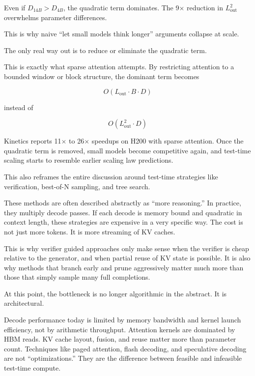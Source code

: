 \documentclass[12pt]{article}
\begin{document}
Even if $D_{14B} > D_{4B}$, the quadratic term dominates. The 9$\times$ reduction in $L_\text{out}^2$ overwhelms parameter differences.

This is why naive ``let small models think longer'' arguments collapse at scale.

The only real way out is to reduce or eliminate the quadratic term.

This is exactly what sparse attention attempts. By restricting attention to a bounded window or block structure, the dominant term becomes

\begin{equation}
O(L_\text{out} \cdot B \cdot D)
\end{equation}

instead of

\begin{equation}
O(L_\text{out}^2 \cdot D)
\end{equation}

Kinetics reports 11$\times$ to 26$\times$ speedups on H200 with sparse attention. Once the quadratic term is removed, small models become competitive again, and test-time scaling starts to resemble earlier scaling law predictions.

This also reframes the entire discussion around test-time strategies like verification, best-of-N sampling, and tree search.

These methods are often described abstractly as ``more reasoning.'' In practice, they multiply decode passes. If each decode is memory bound and quadratic in context length, these strategies are expensive in a very specific way. The cost is not just more tokens. It is more streaming of KV caches.

This is why verifier guided approaches only make sense when the verifier is cheap relative to the generator, and when partial reuse of KV state is possible. It is also why methods that branch early and prune aggressively matter much more than those that simply sample many full completions.

At this point, the bottleneck is no longer algorithmic in the abstract. It is architectural.

Decode performance today is limited by memory bandwidth and kernel launch efficiency, not by arithmetic throughput. Attention kernels are dominated by HBM reads. KV cache layout, fusion, and reuse matter more than parameter count. Techniques like paged attention, flash decoding, and speculative decoding are not ``optimizations.'' They are the difference between feasible and infeasible test-time compute.
\end{document}
